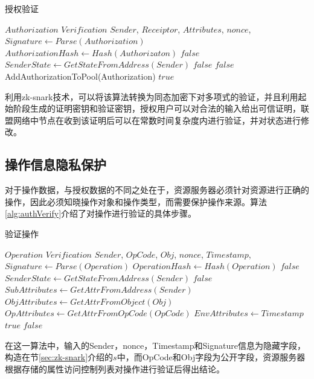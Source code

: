  \begin{algorithm}
 \caption{授权验证}\label{alg:authVerify}
   \begin{algorithmic}[!htbp]
   \renewcommand{\algorithmicrequire}{\textbf{Input:}}
   \renewcommand{\algorithmicensure}{\textbf{Output:}}
   \REQUIRE $Authorization$
   \ENSURE  $Verification$
    \STATE $Sender$, $Receiptor$, $Attributes$, $nonce$, $Signature \gets Parse(Authorization)$
    \STATE $AuthorizationHash \gets Hash(Authorizaton)$
      \RETURN $false$
    \ENDIF
    \STATE $SenderState \gets GetStateFromAddress(Sender)$
      \RETURN $false$
    \ENDIF
        \RETURN $false$
      \ENDIF
    \ENDFOR
    \STATE AddAuthorizationToPool(Authorization)
   \RETURN $true$
   \end{algorithmic}
 \end{algorithm}

利用zk-snark技术，可以将该算法转换为同态加密下对多项式的验证，并且利用起始阶段生成的证明密钥和验证密钥，授权用户可以对合法的输入给出可信证明，联盟网络中节点在收到该证明后可以在常数时间复杂度内进行验证，并对状态进行修改。

\subsection{操作信息隐私保护}

对于操作数据，与授权数据的不同之处在于，资源服务器必须针对资源进行正确的操作，因此必须知晓操作对象和操作类型，而需要保护操作来源。算法\ref{alg:authVerify}介绍了对操作进行验证的具体步骤。

 \begin{algorithm}
 \caption{验证操作}
   \begin{algorithmic}[H]\label{alg:opVerify}
   \renewcommand{\algorithmicrequire}{\textbf{Input:}}
   \renewcommand{\algorithmicensure}{\textbf{Output:}}
   \REQUIRE $Operation$
   \ENSURE  $Verification$
    \STATE $Sender$, $OpCode$, $Obj$, $nonce$, $Timestamp$, $Signature \gets Parse(Operation)$
    \STATE $OperationHash \gets Hash(Operation)$
      \RETURN $false$
    \ENDIF
    \STATE $SenderState \gets GetStateFromAddress(Sender)$
      \RETURN $false$
    \ENDIF
    \STATE$SubAttributes \gets GetAttrFromAddress(Sender)$
    \STATE$ObjAttributes \gets GetAttrFromObject(Obj)$
    \STATE$OpAttributes \gets GetAttrFromOpCode(OpCode)$
    \STATE$EnvAttributes \gets Timestamp$
        \RETURN $true$
      \ENDIF
    \ENDFOR
   \RETURN $false$
   \end{algorithmic}
 \end{algorithm}

在这一算法中，输入的Sender，nonce，Timestamp和Signature信息为隐藏字段，构造在节\ref{sec:zk-snark}介绍的$s$中，而OpCode和Obj字段为公开字段，资源服务器根据存储的属性访问控制列表对操作进行验证后得出结论。

